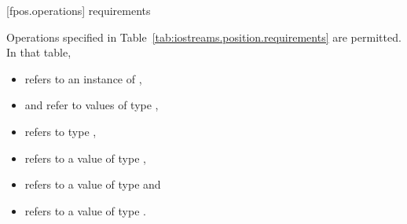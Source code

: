 [fpos.operations]{ requirements}

\pnum
{}%
%
Operations specified in Table~\ref{tab:iostreams.position.requirements} are permitted.
In that table,
\begin{itemize}
\item {} refers to an instance of ,
\item {} and  refer to values of type ,
\item {} refers to type ,
\item {} refers to a value of type ,
\item {} refers to a value of type  and
\item {} refers to a value of type .
\end{itemize}

